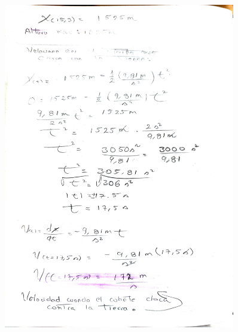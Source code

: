 \documentclass{article}
\begin{document}
\begin{figure}[H]
  \centering
  \includegraphics[width=0.9\textwidth]{assets/32.jpg}
  \label{fig:example_image32}
\end{figure}

\newpage
\end{document}
